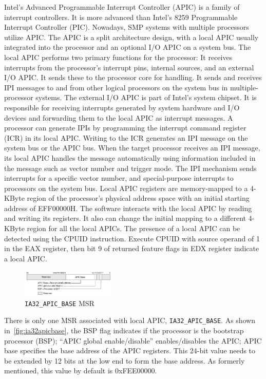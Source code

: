 Intel's Advanced Programmable Interrupt Controller (APIC) is a family of interrupt controllers. It is more advanced than Intel's 8259 Programmable Interrupt Controller (PIC). Nowadays, SMP systems with multiple processors utilize APIC. The APIC is a split architecture design, with a local APIC usually integrated into the processor and an optional I/O APIC on a system bus. The local APIC performs two primary functions for the processor:
It receives interrupts from the processor's interrupt pins, internal sources, and an external I/O APIC. It sends these to the processor core for handling.
It sends and receives IPI messages to and from other logical processors on the system bus in multiple-processor systems.
The external I/O APIC is part of Intel's system chipset. It is responsible for receiving interrupts generated by system hardware and I/O devices and forwarding them to the local APIC as interrupt messages. A processor can generate IPIs by programming the interrupt command register (ICR) in its local APIC. Writing to the ICR generates an IPI message on the system bus or the APIC bus. When the target processor receives an IPI message, its local APIC handles the message automatically using information included in the message such as vector number and trigger mode. The IPI mechanism sends interrupts for a specific vector number, and special-purpose interrupts to processors on the system bus. Local APIC registers are memory-mapped to a 4-KByte region of the processor's physical address space with an initial starting address of EFF00000H. The software interacts with the local APIC by reading and writing its registers. It also can change the initial mapping to a different 4-KByte region for all the local APICs. The presence of a local APIC can be detected using the CPUID instruction. Execute CPUID with source operand of 1 in the EAX register, then bit 9 of returned feature flags in EDX register indicate a local APIC.


\begin{figure}[th]
  \includegraphics[width=0.40\textwidth]{figures/ia32apicbase}
  \centering
  \caption{\texttt{IA32\_APIC\_BASE} MSR}
  \label{fig:ia32apicbase}
\end{figure}

There is only one MSR associated with local APIC, \texttt{IA32\_APIC\_BASE}. As shown in~\autoref{fig:ia32apicbase}, the BSP flag indicates if the processor is the bootstrap processor (BSP); ``APIC global enable/disable'' enables/disables the APIC; APIC base specifies the base address of the APIC registers. This 24-bit value needs to be extended by 12 bits at the low end to form the base address. As formerly mentioned, this value by default is 0xFEE00000.

